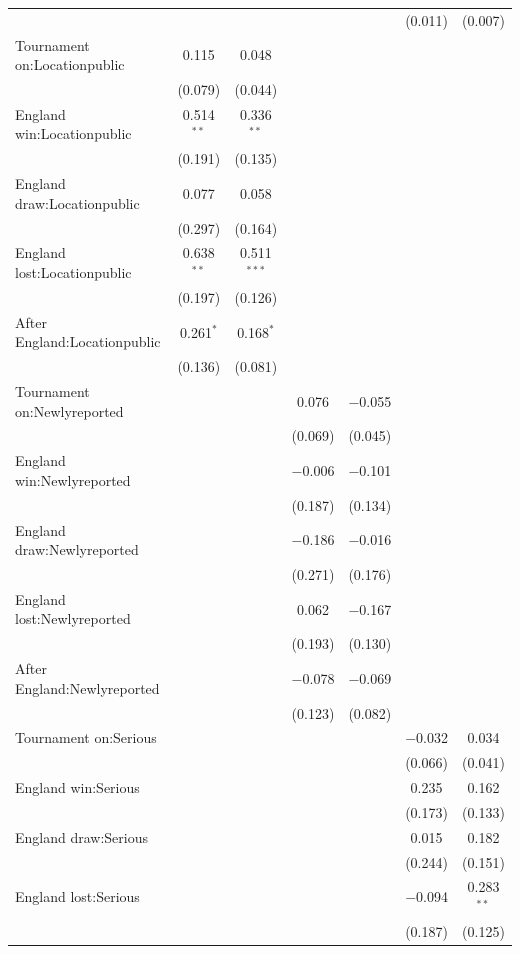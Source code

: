 \documentclass[12pt, letterpaper]{article}
\begin{document}
\begin{table}
{\begin{tabular}{@{\extracolsep{5pt}}lcccccc}
  &  &  &  &  & (0.011) & (0.007) \\ 
  Tournament on:Locationpublic & 0.115 & 0.048 &  &  &  &  \\ 
  & (0.079) & (0.044) &  &  &  &  \\ 
  England win:Locationpublic & 0.514$^{**}$ & 0.336$^{**}$ &  &  &  &  \\ 
  & (0.191) & (0.135) &  &  &  &  \\ 
  England draw:Locationpublic & 0.077 & 0.058 &  &  &  &  \\ 
  & (0.297) & (0.164) &  &  &  &  \\ 
  England lost:Locationpublic & 0.638$^{**}$ & 0.511$^{***}$ &  &  &  &  \\ 
  & (0.197) & (0.126) &  &  &  &  \\ 
  After England:Locationpublic & 0.261$^{*}$ & 0.168$^{*}$ &  &  &  &  \\ 
  & (0.136) & (0.081) &  &  &  &  \\ 
  Tournament on:Newlyreported &  &  & 0.076 & $-$0.055 &  &  \\ 
  &  &  & (0.069) & (0.045) &  &  \\ 
  England win:Newlyreported &  &  & $-$0.006 & $-$0.101 &  &  \\ 
  &  &  & (0.187) & (0.134) &  &  \\ 
  England draw:Newlyreported &  &  & $-$0.186 & $-$0.016 &  &  \\ 
  &  &  & (0.271) & (0.176) &  &  \\ 
  England lost:Newlyreported &  &  & 0.062 & $-$0.167 &  &  \\ 
  &  &  & (0.193) & (0.130) &  &  \\ 
  After England:Newlyreported &  &  & $-$0.078 & $-$0.069 &  &  \\ 
  &  &  & (0.123) & (0.082) &  &  \\ 
  Tournament on:Serious &  &  &  &  & $-$0.032 & 0.034 \\ 
  &  &  &  &  & (0.066) & (0.041) \\ 
  England win:Serious &  &  &  &  & 0.235 & 0.162 \\ 
  &  &  &  &  & (0.173) & (0.133) \\ 
  England draw:Serious &  &  &  &  & 0.015 & 0.182 \\ 
  &  &  &  &  & (0.244) & (0.151) \\ 
  England lost:Serious &  &  &  &  & $-$0.094 & 0.283$^{**}$ \\ 
  &  &  &  &  & (0.187) & (0.125) \\ 

\end{tabular}}
\end{table}
\end{document}

